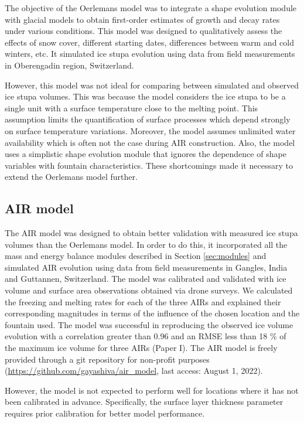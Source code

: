 The objective of the Oerlemans model was to integrate a shape evolution module with glacial models to obtain
first-order estimates of growth and decay rates under various conditions. This model was designed to
qualitatively assess the effects of snow cover, different starting dates, differences between warm and cold
winters, etc. It simulated ice stupa evolution using data from field measurements in Oberengadin region,
Switzerland. 

However, this model was not ideal for comparing between simulated and observed ice stupa volumes. This was
because the model considers the ice stupa to be a single unit with a surface temperature close to the melting
point. This assumption limits the quantification of surface processes which depend strongly on surface
temperature variations. Moreover, the model assumes unlimited water availability which is often not the case
during AIR construction. Also, the model uses a simplistic shape evolution module that ignores the dependence of
shape variables with fountain characteristics. These shortcomings made it necessary to extend the Oerlemans
model further.

\subsection{AIR model}

The AIR model was designed to obtain better validation with measured ice stupa volumes than the Oerlemans model.
In order to do this, it incorporated all the mass and energy balance modules described in Section
\ref{sec:modules} and simulated AIR evolution using data from field measurements in Gangles, India and
Guttannen, Switzerland. The model was calibrated and validated with ice volume and surface area observations
obtained via drone surveys. We calculated the freezing and melting rates for each of the three AIRs and
explained their corresponding magnitudes in terms of the influence of the chosen location and the fountain used.
The model was successful in reproducing the observed ice volume evolution with a correlation greater than 0.96
and an \ac{RMSE} less than 18 \% of the maximum ice volume for three AIRs (Paper I). The AIR model is freely
provided through a git repository for non-profit purposes (\url{https://github.com/gayashiva/air_model}, last
access: August 1, 2022). 

However, the model is not expected to perform well for locations where it has not been calibrated in advance.
Specifically, the surface layer thickness parameter requires prior calibration for better model performance.

